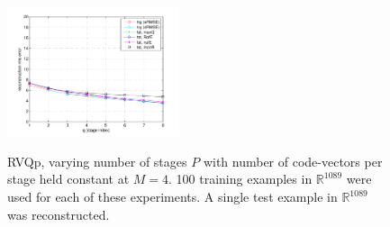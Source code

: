 \begin{Body}
\begin{figure}[t]
								{\includegraphics[width=0.45\textwidth]{thesis/RVQ_8x4_Dudek.pdf}}
								\caption{RVQp, varying number of stages $P$ with number of code-vectors per stage held constant at $M=4$. 100 training examples in $\mathbb{R}^{1089}$ were used for each of these experiments. A single test example in $\mathbb{R}^{1089}$ was reconstructed.}
								\label{fig:RVQ_results_varyingP}
								\end{figure}
								

\end{Body}
